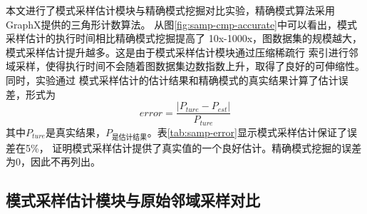 \documentclass[master]{thesis-uestc}
\begin{document}
    本文进行了模式采样估计模块与精确模式挖掘对比实验，精确模式算法采用GraphX提供的三角形计数算法。
从图\ref{fig:samp-cmp-accurate}中可以看出，模式采样估计的执行时间相比精确模式挖掘提高了
10x-1000x，图数据集的规模越大，模式采样估计提升越多。这是由于模式采样估计模块通过压缩稀疏行
索引进行邻域采样，使得执行时间不会随着图数据集边数指数上升，取得了良好的可伸缩性。同时，实验通过
模式采样估计的估计结果和精确模式的真实结果计算了估计误差，形式为
\begin{equation}
    error=\frac{|P_{ture}-P_{est}|}{P_{ture}}
    \label{eq:error}
\end{equation}
其中$P_{ture}$是真实结果，$P_{是估计结果}$。表\ref{tab:samp-error}显示模式采样估计保证了误差在5\%，
证明模式采样估计提供了真实值的一个良好估计。精确模式挖掘的误差为0，因此不再列出。

\subsection{模式采样估计模块与原始邻域采样对比}
\label{subsec:sampling-cmp-asap}
\end{document}

